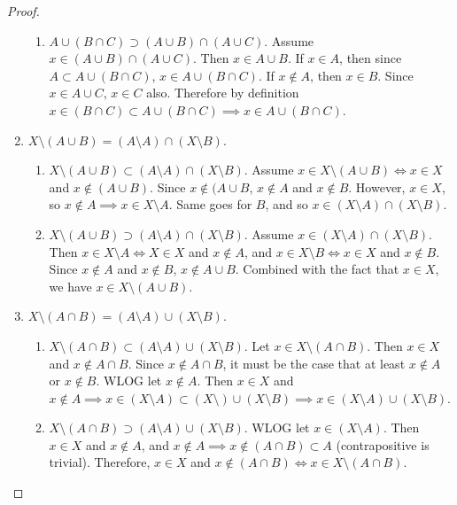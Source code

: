 \documentclass{article}
\begin{document}
\begin{proof}
\begin{enumerate}
\begin{enumerate}
            \item $A \cup (B \cap C) \supset (A \cup B) \cap (A \cup C)$. Assume $x \in (A \cup B) \cap (A \cup C)$. Then $x \in A \cup B$. If $x \in A$, then since $A \subset A \cup (B \cap C)$, $x \in A \cup (B \cap C)$. If $x \not\in A$, then $x \in B$. Since $x \in A \cup C$, $x \in C$ also. Therefore by definition $x \in (B \cap C) \subset A \cup (B \cap C) \implies x \in A \cup (B \cap C)$. 
          \end{enumerate}

        \item $X \setminus (A \cup B) = (A \setminus A) \cap (X \setminus B)$.
          \begin{enumerate}
            \item $X \setminus (A \cup B) \subset (A \setminus A) \cap (X \setminus B)$. Assume $x \in X \setminus (A \cup B) \iff x \in X$ and $x \not\in (A \cup B)$. Since $x \not\in (A \cup B$, $x \not\in A$ and $x \not\in B$. However, $x \in X$, so $x \not\in A \implies x \in X \setminus A$. Same goes for $B$, and so $x \in (X \setminus A) \cap (X \setminus B)$. 

            \item $X \setminus (A \cup B) \supset (A \setminus A) \cap (X \setminus B)$. Assume $x \in (X \setminus A) \cap (X \setminus B)$. Then $x \in X \setminus A \iff X \in X$ and $x \not\in A$, and $x \in X \setminus B \iff x \in X$ and $x \not\in B$. Since $x \not\in A$ and $x \not\in B$, $x \not\in A \cup B$. Combined with the fact that $x \in X$, we have $x \in X \setminus (A \cup B)$. 
          \end{enumerate}

        \item $X \setminus (A \cap B) = (A \setminus A) \cup (X \setminus B)$.
          \begin{enumerate}
            \item $X \setminus (A \cap B) \subset (A \setminus A) \cup (X \setminus B)$. Let $x \in X \setminus (A \cap B)$. Then $x \in X$ and $x \not\in A \cap B$. Since $x \not\in A \cap B$, it must be the case that at least $x \not\in A$ or $x \not\in B$. WLOG let $x \not\in A$. Then $x \in X$ and $x \not\in A \implies x \in (X \setminus A) \subset (X \setminus) \cup (X \setminus B) \implies x \in (X \setminus A) \cup (X \setminus B)$. 

            \item $X \setminus (A \cap B) \supset (A \setminus A) \cup (X \setminus B)$. WLOG let $x \in (X \setminus A)$. Then $x \in X$ and $x \not\in A$, and $x \not\in A \implies x \not\in (A \cap B) \subset A$ (contrapositive is trivial). Therefore, $x \in X$ and $x \not\in (A \cap B) \iff  x \in X \setminus (A \cap B)$. 
          \end{enumerate}
      \end{enumerate}
    \end{proof} 
\end{document}
